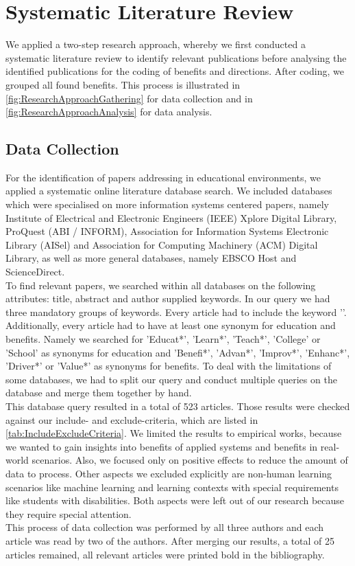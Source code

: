 \section{Systematic Literature Review}
\label{sec:SystematicLiteratureReview}
We applied a two-step research approach, whereby we first conducted a systematic literature review to identify relevant publications before analysing the identified publications for the coding of benefits and directions. After coding, we grouped all found benefits. This process is illustrated in \ref{fig:ResearchApproachGathering} for data collection and in \ref{fig:ResearchApproachAnalysis} for data analysis.

\subsection{Data Collection}
\label{subsec:DataCollection}
For the identification of papers addressing \AR in educational environments, we applied a systematic online literature database search. We included databases which were specialised on more information systems centered papers, namely Institute of Electrical and Electronic Engineers (IEEE) Xplore Digital Library, ProQuest (ABI / INFORM), Association for Information Systems Electronic Library (AISel) and Association for Computing Machinery (ACM) Digital Library, as well as more general databases, namely EBSCO Host and ScienceDirect.\\
To find relevant papers, we searched within all databases on the following attributes: title, abstract and author supplied keywords. In our query we had three mandatory groups of keywords. Every article had to include the keyword '\AR'. Additionally, every article had to have at least one synonym for education and benefits. Namely we searched for 'Educat*', 'Learn*', 'Teach*', 'College' or 'School' as synonyms for education and 'Benefi*', 'Advan*', 'Improv*', 'Enhanc*', 'Driver*' or 'Value*' as synonyms for benefits. To deal with the limitations of some databases, we had to split our query and conduct multiple queries on the database and merge them together by hand.\\
This database query resulted in a total of 523 articles. Those results were checked against our include- and exclude-criteria, which are listed in \ref{tab:IncludeExcludeCriteria}. We limited the results to empirical works, because we wanted to gain insights into benefits of applied systems and benefits in real-world scenarios. Also, we focused only on positive effects to reduce the amount of data to process. Other aspects we excluded explicitly are non-human learning scenarios like machine learning and learning contexts with special requirements like students with disabilities. Both aspects were left out of our research because they require special attention. \\
This process of data collection was performed by all three authors and each article was read by two of the authors. After merging our results, a total of 25 articles remained, all relevant articles were printed bold in the bibliography.

